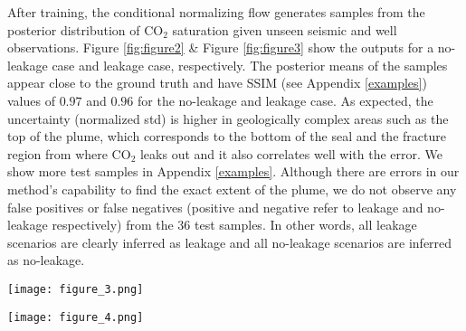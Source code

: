 \documentclass{article}
\begin{document}
After training, the conditional normalizing flow generates samples from the posterior distribution of CO$_{2}$ saturation given unseen seismic and well observations. Figure \ref{fig:figure2} \& Figure \ref{fig:figure3} show the outputs for a no-leakage case and leakage case, respectively. The posterior means of the samples appear close to the ground truth and have SSIM (see Appendix \ref{examples}) values of $0.97$ and $0.96$ for the no-leakage and leakage case. As expected, the uncertainty (normalized std) is higher in geologically complex areas such as the top of the plume, which corresponds to the bottom of the seal and the fracture region from where CO$_{2}$ leaks out and it also correlates well with the error. We show more test samples in Appendix \ref{examples}.  Although there are errors in our method's capability to find the exact extent of the plume, we do not observe any false positives or false negatives (positive and negative refer to leakage and no-leakage respectively) from the 36 test samples. In other words, all leakage scenarios are clearly inferred as leakage and all no-leakage scenarios are inferred as no-leakage. 
%
\begin{figure*}[t]
\centering
\texttt{[image: figure\_3.png]}
\caption{\small{Outputs from the trained network for no-leakage case. Refer to Appendix \ref{examples} for details on performance metrics and additional examples.}}
\label{fig:figure2}
\end{figure*}
%
\begin{figure*}[t]
\centering
\texttt{[image: figure\_4.png]}
\caption{\small{Same as Figure \ref{fig:figure2} but now for leakage case.}}
\label{fig:figure3}
\end{figure*}
%
\end{document}
